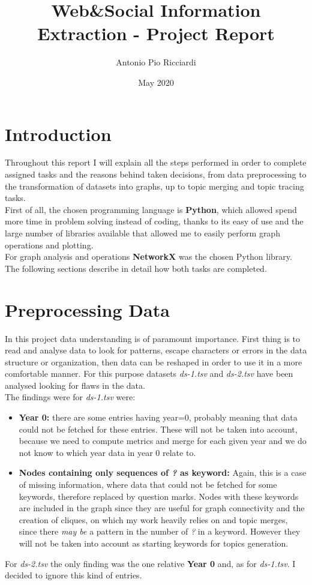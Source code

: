 \documentclass{article}
\title{Web&Social Information Extraction - Project Report}
\author{Antonio Pio Ricciardi}
\date{May 2020}
\begin{document}
\maketitle
\section{Introduction}
Throughout this report I will explain all the steps performed in order to complete assigned tasks and the reasons behind taken decisions, from data preprocessing to the transformation of datasets into graphs, up to topic merging and topic tracing tasks.\\
First of all, the chosen programming language is \textbf{Python}, which allowed spend more time in problem solving instead of coding, thanks to its easy of use and the large number of libraries available that allowed me to easily perform graph operations and plotting.\\
For graph analysis and operations \textbf{NetworkX} was the chosen Python library.
The following sections describe in detail how both tasks are completed.

\section{Preprocessing Data}
In this project data understanding is of paramount importance.
First thing is to read and analyse data to look for patterns, escape characters or errors in the data structure or organization, then data can be reshaped in order to use it in a more comfortable manner.
For this purpose datasets \textit{ds-1.tsv} and \textit{ds-2.tsv} have been analysed looking for flaws in the data.\\
The findings were for \textit{ds-1.tsv} were:
\begin{itemize}
    \item \textbf{Year 0:} there are some entries having year=0, probably meaning that data could not be fetched for these entries. These will not be taken into account, because we need to compute metrics and merge for each given year and we do not know to which year data in year 0 relate to.
    \item \textbf{Nodes containing only sequences of \textit{?} as keyword:} Again, this is a case of missing information, where data that could not be fetched for some keywords, therefore replaced by question marks. Nodes with these keywords are included in the graph since they are useful for graph connectivity and the creation of cliques, on which my work heavily relies on and topic merges, since there \textit{may be} a pattern in the number of \textit{?} in a keyword. However they will not be taken into account as starting keywords for topics generation.
\end{itemize}
For \textit{ds-2.tsv} the only finding was the one relative \textbf{Year 0} and, as for \textit{ds-1.tsv}. I decided to ignore this kind of entries.
\end{document}
